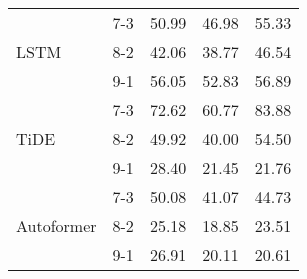 \begin{table}[h!]
\begin{tabular}{|l|c|c|c|c|}
    \rowcolor{white}  & 7-3 & 50.99 & 46.98 & 55.33 \\ 
    \rowcolor{white} LSTM & 8-2 & 42.06 & 38.77 & 46.54 \\ 
    \rowcolor{white}  & 9-1 & 56.05 & 52.83 & 56.89 \\ \hline
    \rowcolor{white!30} & 7-3 & 72.62 & 60.77 & 83.88 \\ 
    \rowcolor{white!30} TiDE & 8-2 & 49.92 & 40.00 & 54.50 \\ 
    \rowcolor{white!30} & 9-1 & 28.40 & 21.45 & 21.76 \\ \hline
    \rowcolor{white}  & 7-3 & 50.08 & 41.07 & 44.73 \\ 
    \rowcolor{white} Autoformer & 8-2 & 25.18 & 18.85 & 23.51 \\ 
    \rowcolor{white}  & 9-1 & 26.91 & 20.11 & 20.61 \\ \hline

    \end{tabular}
\end{table}